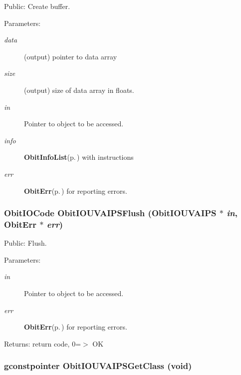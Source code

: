 Public: Create buffer. 

\begin{Desc}
\item[Parameters:]
\begin{description}
\item[{\em data}](output) pointer to data array \item[{\em size}](output) size of data array in floats. \item[{\em in}]Pointer to object to be accessed. \item[{\em info}]{\bf Obit\-Info\-List}{\rm (p.\,\pageref{structObitInfoList})} with instructions \item[{\em err}]{\bf Obit\-Err}{\rm (p.\,\pageref{structObitErr})} for reporting errors. \end{description}
\end{Desc}
\subsubsection{\setlength{\rightskip}{0pt plus 5cm}Obit\-IOCode Obit\-IOUVAIPSFlush ({\bf Obit\-IOUVAIPS} $\ast$ {\em in}, {\bf Obit\-Err} $\ast$ {\em err})}\label{ObitIOUVAIPS_8h_a20}


Public: Flush. 

\begin{Desc}
\item[Parameters:]
\begin{description}
\item[{\em in}]Pointer to object to be accessed. \item[{\em err}]{\bf Obit\-Err}{\rm (p.\,\pageref{structObitErr})} for reporting errors. \end{description}
\end{Desc}
\begin{Desc}
\item[Returns:]return code, 0=$>$ OK \end{Desc}
\subsubsection{\setlength{\rightskip}{0pt plus 5cm}gconstpointer Obit\-IOUVAIPSGet\-Class (void)}\label{ObitIOUVAIPS_8h_a5}



